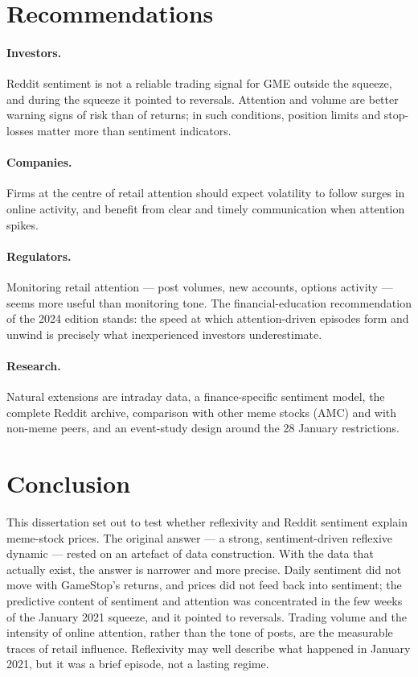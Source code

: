 \documentclass[11pt,a4paper]{article}
\begin{document}
\section{Recommendations}

\paragraph{Investors.} Reddit sentiment is not a reliable trading signal for GME
outside the squeeze, and during the squeeze it pointed to reversals. Attention and
volume are better warning signs of risk than of returns; in such conditions,
position limits and stop-losses matter more than sentiment indicators.

\paragraph{Companies.} Firms at the centre of retail attention should expect
volatility to follow surges in online activity, and benefit from clear and timely
communication when attention spikes.

\paragraph{Regulators.} Monitoring retail attention --- post volumes, new
accounts, options activity --- seems more useful than monitoring tone. The
financial-education recommendation of the 2024 edition stands: the speed at
which attention-driven episodes form and unwind is precisely what inexperienced
investors underestimate.

\paragraph{Research.} Natural extensions are intraday data, a finance-specific
sentiment model, the complete Reddit archive, comparison with other meme stocks
(AMC) and with non-meme peers, and an event-study design around the 28 January
restrictions.

\section{Conclusion}

This dissertation set out to test whether reflexivity and Reddit sentiment
explain meme-stock prices. The original answer --- a strong, sentiment-driven
reflexive dynamic --- rested on an artefact of data construction. With the data
that actually exist, the answer is narrower and more precise. Daily sentiment did
not move with GameStop's returns, and prices did not feed back into sentiment;
the predictive content of sentiment and attention was concentrated in the few
weeks of the January 2021 squeeze, and it pointed to reversals. Trading volume
and the intensity of online attention, rather than the tone of posts, are the
measurable traces of retail influence. Reflexivity may well describe what
happened in January 2021, but it was a brief episode, not a lasting regime.
\end{document}
